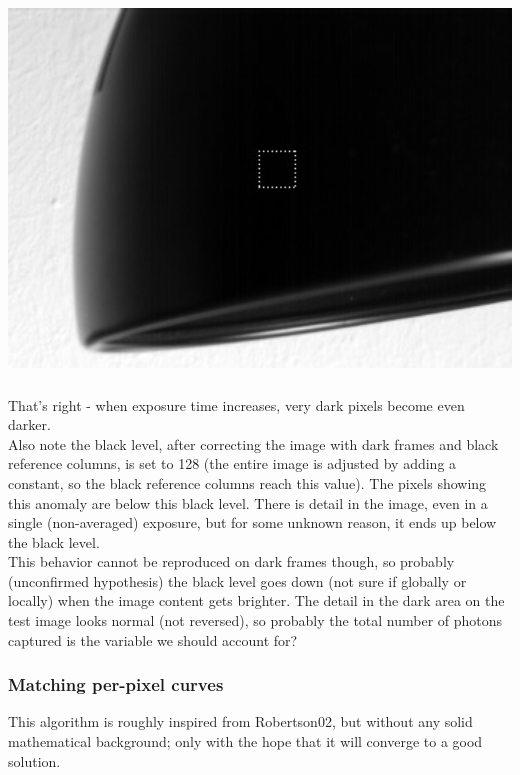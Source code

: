 \begin{center}
\includegraphics[height=10cm]{images/blackhole}
\end{center}

That's right - when exposure time increases, very dark pixels become even darker.\\

Also note the black level, after correcting the image with dark frames and black reference columns, is set to 128 (the entire image is adjusted by adding a constant, so the black reference columns reach this value). The pixels showing this anomaly are below this black level. There is detail in the image, even in a single (non-averaged) exposure, but for some unknown reason, it ends up below the black level.\\

This behavior cannot be reproduced on dark frames though, so probably (unconfirmed hypothesis) the black level goes down (not sure if globally or locally) when the image content gets brighter. The detail in the dark area on the test image looks normal (not reversed), so probably the total number of photons captured is the variable we should account for? \\


\subsubsection{Matching per-pixel curves}

This algorithm is roughly inspired from Robertson02, but without any solid mathematical background; only with the hope that it will converge to a good solution.\\

